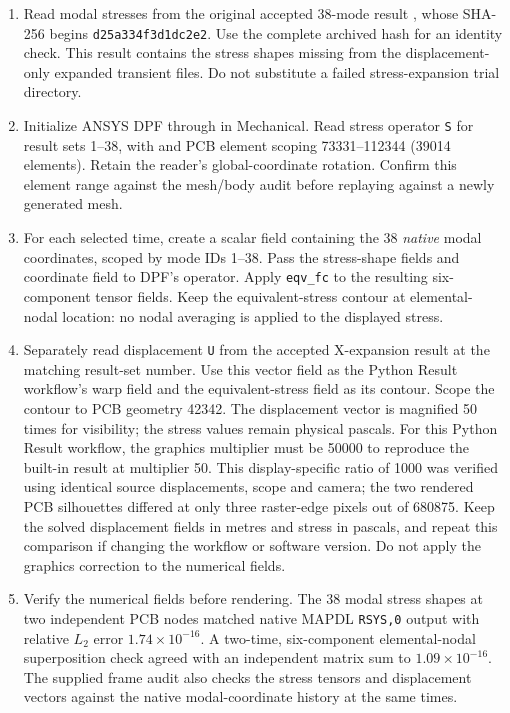 \documentclass[10pt,a4paper]{article}
\begin{document}
\begin{enumerate}
\item Read modal stresses from the original accepted 38-mode result , whose SHA-256 begins \texttt{d25a334f3d1dc2e2}. Use the complete archived hash for an identity check. This result contains the stress shapes missing from the displacement-only expanded transient files. Do not substitute a failed stress-expansion trial directory.
\item Initialize ANSYS DPF through  in Mechanical. Read stress operator \texttt{S} for result sets 1--38, with  and PCB element scoping 73331--112344 (39014 elements). Retain the reader's global-coordinate rotation. Confirm this element range against the mesh/body audit before replaying against a newly generated mesh.
\item For each selected time, create a scalar field containing the 38 \emph{native} modal coordinates, scoped by mode IDs 1--38. Pass the stress-shape fields and coordinate field to DPF's  operator. Apply \texttt{eqv\_fc} to the resulting six-component tensor fields. Keep the equivalent-stress contour at elemental-nodal location: no nodal averaging is applied to the displayed stress.
\item Separately read displacement \texttt{U} from the accepted X-expansion result at the matching result-set number. Use this vector field as the Python Result workflow's warp field and the equivalent-stress field as its contour. Scope the contour to PCB geometry 42342. The displacement vector is magnified 50 times for visibility; the stress values remain physical pascals. For this Python Result workflow, the graphics multiplier must be 50000 to reproduce the built-in result at multiplier 50. This display-specific ratio of 1000 was verified using identical source displacements, scope and camera; the two rendered PCB silhouettes differed at only three raster-edge pixels out of 680875. Keep the solved displacement fields in metres and stress in pascals, and repeat this comparison if changing the workflow or software version. Do not apply the graphics correction to the numerical fields.
\item Verify the numerical fields before rendering. The 38 modal stress shapes at two independent PCB nodes matched native MAPDL \texttt{RSYS,0} output with relative $L_2$ error $1.74\times10^{-16}$. A two-time, six-component elemental-nodal superposition check agreed with an independent matrix sum to $1.09\times10^{-16}$. The supplied frame audit also checks the stress tensors and displacement vectors against the native modal-coordinate history at the same times.

\end{enumerate}
\end{document}

